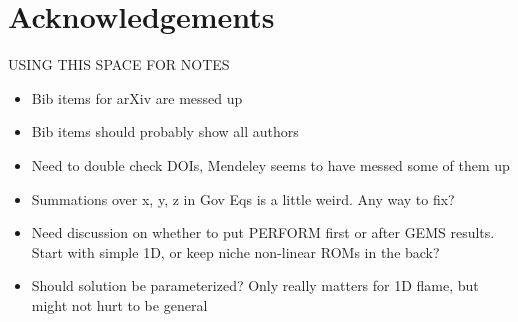 \chapter{Acknowledgements}

{\color{red}
USING THIS SPACE FOR NOTES
\begin{itemize}
	\item Bib items for arXiv are messed up
	\item Bib items should probably show all authors
	\item Need to double check DOIs, Mendeley seems to have messed some of them up
	\item Summations over x, y, z in Gov Eqs is a little weird. Any way to fix?
	\item Need discussion on whether to put PERFORM first or after GEMS results. Start with simple 1D, or keep niche non-linear ROMs in the back?
	\item Should solution be parameterized? Only really matters for 1D flame, but might not hurt to be general
\end{itemize}

}